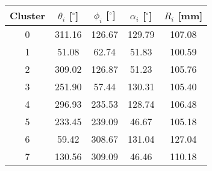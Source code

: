 \begin{tabular}{ccccc}
\hline
Cluster & $\theta_i$ [$^\circ$] & $\phi_i$ [$^\circ$] & $\alpha_i$ [$^\circ$] & $R_i$ [mm] \\
\hline
0       & 311.16                & 126.67              & 129.79                & 107.08     \\
1       & 51.08                 & 62.74               & 51.83                 & 100.59     \\
2       & 309.02                & 126.87              & 51.23                 & 105.76     \\
3       & 251.90                & 57.44               & 130.31                & 105.40     \\
4       & 296.93                & 235.53              & 128.74                & 106.48     \\
5       & 233.45                & 239.09              & 46.67                 & 105.18     \\
6       & 59.42                 & 308.67              & 131.04                & 127.04     \\
7       & 130.56                & 309.09              & 46.46                 & 110.18     \\
\hline
\end{tabular}